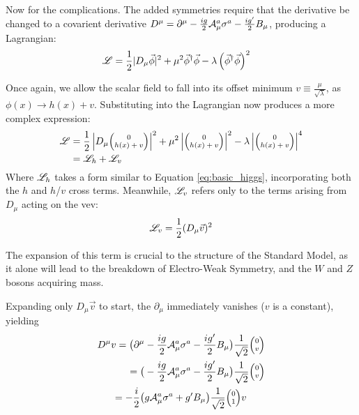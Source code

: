     Now for the complications.
    The added symmetries require that the derivative be changed to a covarient derivative 
        $D^{\mu} = \partial^{\mu} - \frac{ig}{2} \mathcal{A}^a_{\mu} \sigma^a - \frac{ig'}{2} B_{\mu}$,
        producing a Lagrangian:
    \begin{equation} \begin{split}
        \mathscr{L} &= \frac{1}{2} |D_{\mu} \vec{\phi}|^2 +
            \mu^2 \vec{\phi}^\dag \vec{\phi} - \lambda \left( \vec{\phi}^\dag\vec{\phi} \right)^2
    \end{split} \end{equation}

    Once again, we allow the scalar field to fall into its offset minimum $v \equiv \frac{\mu}{\sqrt{\lambda}}$, as $\phi(x) \rightarrow h(x) + v$.
    Substituting into the Lagrangian now produces a more complex expression:
    \begin{equation} \begin{split}
        \label{eq:fullHiggs}
        \Lag & = \frac{1}{2} \left|D_{\mu} \minimatrix{0\\h(x)+v}\right|^2
            + \mu^2 \left|\minimatrix{0\\h(x)+v}\right|^2
            - \lambda \left|\minimatrix{0\\h(x)+v}\right|^4 \\
         & = \Lag_h + \Lag_v
    \end{split} \end{equation}
    Where $\mathscr{L}_h$ takes a form similar to Equation \ref{eq:basic_higgs}, incorporating both the $h$ and $h$/$v$ cross terms.
    Meanwhile, $\mathscr{L}_v$ refers only to the terms arising from $D_{\mu}$ acting on the vev:
    \begin{equation}
        \label{eq:lagv}
        \mathscr{L}_v = \frac{1}{2} (D_{\mu} \vec{v})^2
    \end{equation}

    The expansion of this term is crucial to the structure of the Standard Model,
        as it alone will lead to the breakdown of Electro-Weak Symmetry,
        and the $W$ and $Z$ bosons acquiring mass.

    Expanding only $D_{\mu} \vec{v}$ to start, the $\partial_{\mu}$ immediately vanishes ($v$ is a constant), yielding 
    \begin{equation} \begin{split}
        D^{\mu} v  = \big( \partial^{\mu} & - \frac{ig}{2} \wField^a_{\mu} \sigma^a - \frac{ig'}{2} B_{\mu} \big) \frac{1}{\sqrt{2}}\minimatrix{0\\v} \\
        = \big( & - \frac{ig}{2} \wField^a_{\mu} \sigma^a - \frac{ig'}{2} B_{\mu} \big) \frac{1}{\sqrt{2}}\minimatrix{0\\v} \\
        = - \frac{i}{2} \big( & g \wField^a_{\mu} \sigma^a + g' B_{\mu} \big) \frac{1}{\sqrt{2}}\minimatrix{0\\1} v
    \end{split} \end{equation}

